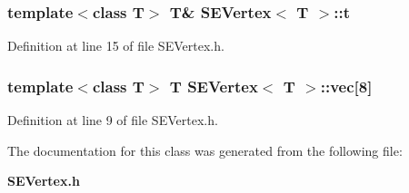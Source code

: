 \subsubsection[{t}]{\setlength{\rightskip}{0pt plus 5cm}template$<$class T$>$ T\& {\bf S\+E\+Vertex}$<$ T $>$\+::t}\label{class_s_e_vertex_a8bdb2760bc285e9157eb311384f86ec8}


Definition at line 15 of file S\+E\+Vertex.\+h.

\subsubsection[{vec}]{\setlength{\rightskip}{0pt plus 5cm}template$<$class T$>$ T {\bf S\+E\+Vertex}$<$ T $>$\+::vec[8]}\label{class_s_e_vertex_a747a2b3e734d3fd18f86213a62d83446}


Definition at line 9 of file S\+E\+Vertex.\+h.



The documentation for this class was generated from the following file\+:\begin{DoxyCompactItemize}
\item 
{\bf S\+E\+Vertex.\+h}\end{DoxyCompactItemize}
